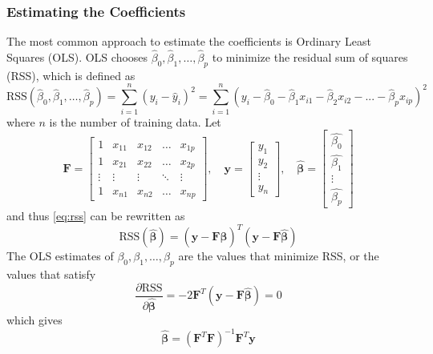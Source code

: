 \documentclass[conf]{new-aiaa}
\begin{document}
\subsubsection{Estimating the Coefficients}
The most common approach to estimate the coefficients is Ordinary Least Squares (OLS). OLS chooses $\hat{\beta}_0, \hat{\beta}_1, \dots, \hat{\beta}_p$ to minimize the residual sum of squares (RSS), which is defined as 
\begin{equation} \label{eq:rss}
    \textrm{RSS}\left(\hat{\beta}_0, \hat{\beta}_1, \dots, \hat{\beta}_p\right) = \sum_{i=1}^{n} \left(y_i - \hat{y}_i\right)^2 = \sum_{i=1}^{n} \left(y_i - \hat{\beta}_0 - \hat{\beta}_1x_{i1} - \hat{\beta}_2x_{i2} - ... - \hat{\beta}_px_{ip}\right)^2
\end{equation}
where $n$ is the number of training data. Let
\begin{equation*}
    \mathbf{F} = 
    \begin{bmatrix}
        1 & x_{11} & x_{12} & \dots & x_{1p} \\
        1 & x_{21} & x_{22} & \dots & x_{2p} \\
        \vdots & \vdots & \vdots & \ddots & \vdots \\
        1 & x_{n1} & x_{n2} & \dots & x_{np}
    \end{bmatrix}, \quad
    \mathbf{y} = 
    \begin{bmatrix}
        y_1 \\ y_2 \\ \vdots \\ y_n
    \end{bmatrix}, \quad
    \hat{\boldsymbol{\beta}} =
    \begin{bmatrix}
        \hat{\beta_0} \\ \hat{\beta_1} \\ \vdots \\ \hat{\beta_p}
    \end{bmatrix}
\end{equation*}
and thus \eqref{eq:rss} can be rewritten as
\begin{equation} \label{eq:rssmat}
    \textrm{RSS}\left(\hat{\boldsymbol{\beta}}\right) = \left(\mathbf{y} - \mathbf{F}\hat{\boldsymbol{\beta}}\right)^T\left(\mathbf{y} - \mathbf{F}\hat{\boldsymbol{\beta}}\right)
\end{equation}
The OLS estimates of $\beta_0, \beta_1, \dots, \beta_p$ are the values that minimize RSS, or the values that satisfy
\begin{equation} \label{eq:ols}
    \frac{\partial \textrm{RSS}}{\partial \hat{\boldsymbol{\beta}}} = -2\mathbf{F}^T\left(\mathbf{y} - \mathbf{F}\hat{\boldsymbol{\beta}}\right) = 0
\end{equation}
which gives
\begin{equation} \label{eq:betaval}
    \hat{\boldsymbol{\beta}} = \left(\mathbf{F}^T\mathbf{F}\right)^{-1}\mathbf{F}^T\mathbf{y}
\end{equation}
\end{document}
